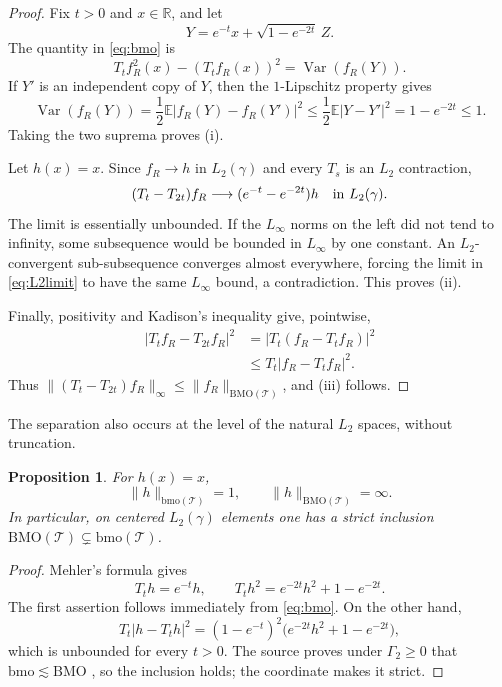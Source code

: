 \documentclass[11pt]{article}
\newtheorem{proposition}{Proposition}
\newcommand{\R}{\mathbb R}
\newcommand{\E}{\mathbb E}
\newcommand{\g}{\gamma}
\newcommand{\T}{\mathcal T}
\newcommand{\bmo}{\mathrm{bmo}}
\newcommand{\BMO}{\mathrm{BMO}}
\newcommand{\Ga}{\Gamma}
\begin{document}
\begin{proof}
Fix $t>0$ and $x\in\R$, and let
\[
 Y=e^{-t}x+\sqrt{1-e^{-2t}}\,Z.
\]
The quantity in \eqref{eq:bmo} is
\[
 T_tf_R^2(x)-(T_tf_R(x))^2=\operatorname{Var}(f_R(Y)).
\]
If $Y'$ is an independent copy of $Y$, then the $1$-Lipschitz property gives
\[
 \operatorname{Var}(f_R(Y))
 =\frac12\E|f_R(Y)-f_R(Y')|^2
 \leq\frac12\E|Y-Y'|^2
 =1-e^{-2t}\leq1.
\]
Taking the two suprema proves (i).

Let $h(x)=x$.  Since $f_R\to h$ in $L_2(\g)$ and every $T_s$ is an
$L_2$ contraction,
\begin{equation}\label{eq:L2limit}
 (T_t-T_{2t})f_R
 \longrightarrow (e^{-t}-e^{-2t})h
 \quad\hbox{in }L_2(\g).
\end{equation}
The limit is essentially unbounded.  If the $L_\infty$ norms on the left did
not tend to infinity, some subsequence would be bounded in $L_\infty$ by one
constant.  An $L_2$-convergent sub-subsequence converges almost everywhere,
forcing the limit in \eqref{eq:L2limit} to have the same $L_\infty$ bound, a
contradiction.  This proves (ii).

Finally, positivity and Kadison's inequality give, pointwise,
\begin{align*}
 |T_tf_R-T_{2t}f_R|^2
 &=|T_t(f_R-T_tf_R)|^2\\
 &\leq T_t|f_R-T_tf_R|^2.
\end{align*}
Thus $\|(T_t-T_{2t})f_R\|_\infty\leq\|f_R\|_{\BMO(\T)}$, and (iii)
follows.
\end{proof}

The separation also occurs at the level of the natural $L_2$ spaces, without
truncation.

\begin{proposition}\label{prop:strict}
For $h(x)=x$,
\[
 \|h\|_{\bmo(\T)}=1,
 \qquad
 \|h\|_{\BMO(\T)}=\infty.
\]
In particular, on centered $L_2(\g)$ elements one has a strict inclusion
$\BMO(\T)\subsetneq\bmo(\T)$.
\end{proposition}

\begin{proof}
Mehler's formula gives
\[
 T_th=e^{-t}h,
 \qquad
 T_th^2=e^{-2t}h^2+1-e^{-2t}.
\]
The first assertion follows immediately from \eqref{eq:bmo}.  On the other
hand,
\[
 T_t|h-T_th|^2
 =(1-e^{-t})^2\big(e^{-2t}h^2+1-e^{-2t}\big),
\]
which is unbounded for every $t>0$.  The source proves under $\Ga_2\geq0$
that $\bmo\lesssim\BMO$ \cite[Proposition 2.4]{JungeMei}, so the inclusion
holds; the coordinate makes it strict.
\end{proof}
\end{document}

